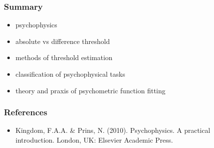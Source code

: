 \documentclass[]{beamer}
\begin{document}
\begin{frame}
 \frametitle{Summary}
\begin{itemize}
\setlength{\itemsep}{5pt}
 \item psychophysics
 \item absolute vs difference threshold
 \item methods of threshold estimation
 \item classification of psychophysical tasks
 \item theory and praxis of psychometric function fitting
\end{itemize}
\end{frame}



\begin{frame}
 \frametitle{References}
\begin{small}
\begin{itemize}
 \item   Kingdom, F.A.A. \& Prins, N. (2010). Psychophysics. A practical introduction. London, UK: Elsevier Academic Press.
\end{itemize}
\end{small}
\end{frame}
\end{document}
